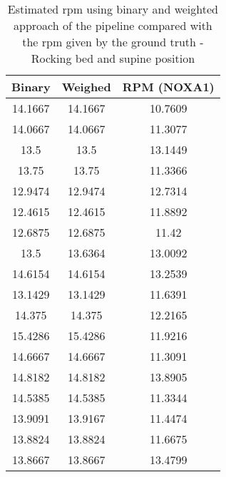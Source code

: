 \begin{table}[h]
    \centering
    \begin{tabular}{|c|c|c|}
 
    \hline 
    Binary & Weighed & RPM (NOXA1) \\ 
    \hline 
14.1667     &  14.1667  &     10.7609 \\ 
14.0667   &    14.0667  &     11.3077 \\ 
13.5     &     13.5  &     13.1449 \\ 
13.75    &     13.75   &    11.3366 \\ 
12.9474    &   12.9474 &      12.7314 \\ 
12.4615   &    12.4615    &   11.8892 \\ 
12.6875   &    12.6875     &    11.42 \\ 
13.5   &    13.6364 &      13.0092 \\ 
14.6154  &     14.6154  &     13.2539 \\ 
13.1429   &    13.1429  &     11.6391 \\ 
14.375   &     14.375  &     12.2165 \\ 
15.4286   &    15.4286   &    11.9216 \\ 
14.6667   &    14.6667   &    11.3091 \\ 
14.8182   &    14.8182   &    13.8905 \\ 
14.5385   &    14.5385  &     11.3344 \\ 
13.9091    &   13.9167  &     11.4474 \\ 
13.8824  &     13.8824  &     11.6675 \\ 
13.8667   &    13.8667   &    13.4799 \\ 
\hline
    \end{tabular}
\caption{Estimated rpm using binary and weighted approach of the pipeline compared with the rpm given by the ground truth - Rocking bed and supine position}
\label{tab:SupineMovsg}

\end{table}